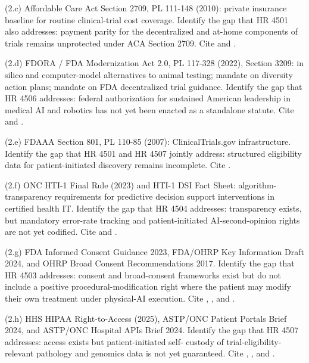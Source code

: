 (2.c) Affordable Care Act Section 2709, PL 111-148 (2010): private
insurance baseline for routine clinical-trial cost coverage. Identify
the gap that HR 4501 also addresses: payment parity for the
decentralized and at-home components of trials remains unprotected
under ACA Section 2709. Cite \cite{rank3_aca_clinical_trials_2010}
and \cite{usc_300gg8_clinical_trials}.

(2.d) FDORA / FDA Modernization Act 2.0, PL 117-328 (2022),
Section 3209: in silico and computer-model alternatives to animal
testing; mandate on diversity action plans; mandate on FDA decentralized
trial guidance. Identify the gap that HR 4506 addresses: federal
authorization for sustained American leadership in medical AI and
robotics has not yet been enacted as a standalone statute. Cite
\cite{rank4_fdora_fda_modernization_2022} and \cite{fda_dct_guidance_2024}.

(2.e) FDAAA Section 801, PL 110-85 (2007): ClinicalTrials.gov
infrastructure. Identify the gap that HR 4501 and HR 4507 jointly
address: structured eligibility data for patient-initiated discovery
remains incomplete. Cite \cite{rank5_fdaaa_2007}.

(2.f) ONC HTI-1 Final Rule (2023) and HTI-1 DSI Fact Sheet:
algorithm-transparency requirements for predictive decision support
interventions in certified health IT. Identify the gap that HR 4504
addresses: transparency exists, but mandatory error-rate tracking and
patient-initiated AI-second-opinion rights are not yet codified. Cite
\cite{rank9_onc_hti1_2023} and \cite{hti1_dsi_fact_sheet_2023}.

(2.g) FDA Informed Consent Guidance 2023, FDA/OHRP Key Information
Draft 2024, and OHRP Broad Consent Recommendations 2017. Identify the
gap that HR 4503 addresses: consent and broad-consent frameworks exist
but do not include a positive procedural-modification right where the
patient may modify their own treatment under physical-AI execution.
Cite \cite{fda_informed_consent_guidance_2023},
\cite{fda_ohrp_key_information_draft_2024}, and
\cite{ohrp_broad_consent_attachment_c_2017}.

(2.h) HHS HIPAA Right-to-Access (2025), ASTP/ONC Patient Portals
Brief 2024, and ASTP/ONC Hospital APIs Brief 2024. Identify the gap
that HR 4507 addresses: access exists but patient-initiated self-
custody of trial-eligibility-relevant pathology and genomics data is
not yet guaranteed. Cite \cite{hhs_right_to_access_2025},
\cite{astp_onc_patient_portals_apps_2024}, and
\cite{astp_onc_hospital_apis_2024}.

